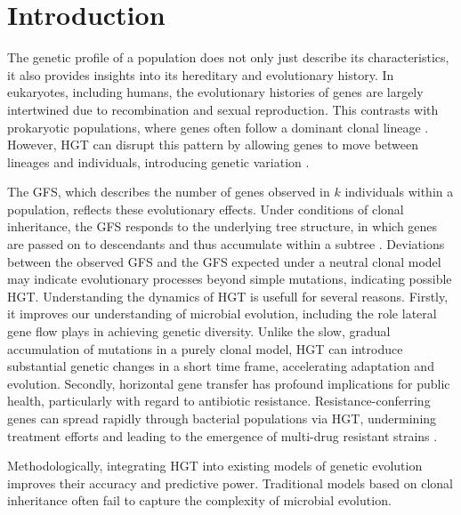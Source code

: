 \chapter{Introduction}\label{kap:introduction}
The genetic profile of a population does not only just describe its characteristics,
it also provides insights into its hereditary and evolutionary history.
In eukaryotes, including humans, the evolutionary histories of genes are largely intertwined due to recombination and sexual reproduction.
This contrasts with prokaryotic populations, where genes often follow a dominant clonal lineage \cite{Human_Popgen_Lohmueller_2021}.
However, \ac{HGT} can disrupt this pattern by allowing genes to move between lineages and individuals, introducing genetic variation \cite{Gen_Molekbio_Schmidt_2023}.

The \ac{GFS}, which describes the number of genes observed in $k$ individuals within a population, reflects these evolutionary effects.
Under conditions of clonal inheritance, the \ac{GFS} responds to the underlying tree structure, in which genes are passed on to descendants and thus accumulate within a subtree \cite{Baumdicker_2014}.
Deviations between the observed \ac{GFS} and the \ac{GFS} expected under a neutral clonal model may indicate evolutionary processes beyond simple mutations, indicating possible \ac{HGT}.
Understanding the dynamics of \ac{HGT} is usefull for several reasons.
Firstly, it improves our understanding of microbial evolution, including the role lateral gene flow plays in achieving genetic diversity.
Unlike the slow, gradual accumulation of mutations in a purely clonal model, \ac{HGT} can introduce substantial genetic changes in a short time frame, accelerating adaptation and evolution.
Secondly, horizontal gene transfer has profound implications for public health, particularly with regard to antibiotic resistance.
Resistance-conferring genes can spread rapidly through bacterial populations via \ac{HGT}, undermining treatment efforts and leading to the emergence of multi-drug resistant strains \cite{HGT_Burmeister_2015}.

Methodologically, integrating \ac{HGT} into existing models of genetic evolution improves their accuracy and predictive power.
Traditional models based on clonal inheritance often fail to capture the complexity of microbial evolution.

